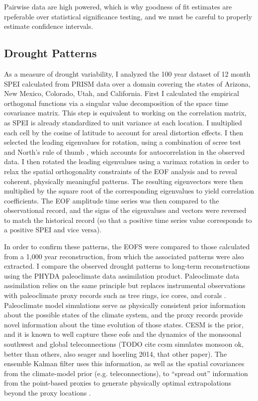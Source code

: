 \documentclass[11pt]{wlscirep}
\begin{document}
Pairwise data are high powered, which is why goodness of fit estimates are rpeferable over statistical significance testing, and we must be careful to properly estimate confidence intervals.

\subsection*{Drought Patterns}
As a measure of drought variability, I analyzed the 100 year dataset of 12 month SPEI calculated from PRISM data over a domain covering the states of Arizona, New Mexico, Colorado, Utah, and California. First I calculated the empirical orthogonal functions via a singular value decomposition of the space time covariance matrix. This step is equivalent to working on the correlation matrix, as SPEI is already standardized to unit variance at each location. I multiplied each cell by the cosine of latitude to account for areal distortion effects. I then selected the leading eigenvalues for rotation, using a combination of scree test and North's rule of thumb \cite{North1982}, which accounts for autocorrelation in the observed data. I then rotated the leading eigenvalues using a varimax rotation in order to relax the spatial orthogonality constraints of the EOF analysis and to reveal coherent, physically meaningful patterns. The resulting eigenvectors were then multiplied by the square root of the corresponding eigenvalues to yield correlation coefficients. The EOF amplitude time series was then compared to the observational record, and the signs of the eigenvalues and vectors were reversed to match the historical record (so that a positive time series value corresponds to a positive SPEI and vice versa).

In order to confirm these patterns, the EOFS were compared to those calculated from a 1,000 year reconstruction, from which the associated patterns were also extracted. I compare the observed drought patterns to long-term reconstructions using the PHYDA paleoclimate data assimilation product. Paleoclimate data assimilation relies on the same principle but replaces instrumental observations with paleoclimate proxy records such as tree rings, ice cores, and corals \cite{Hakim2016TheResults}. Paleoclimate model simulations serve as physically consistent prior information about the possible states of the climate system, and the proxy records provide novel information about the time evolution of those states. CESM is the prior, and it is known to well capture these eofs and the dynamics of the monsoonal southwest and global teleconnections (TODO cite ccsm simulates monsoon ok, better than others, also seager and hoerling 2014, that other paper). The ensemble Kalman filter uses this information, as well as the spatial covariances from the climate-model prior (e.g. teleconnections), to ``spread out'' information from the point-based proxies to generate physically optimal extrapolations beyond the proxy locations \cite{Acevedo2015TowardsTechniques,Hakim2016TheResults}.
\end{document}
